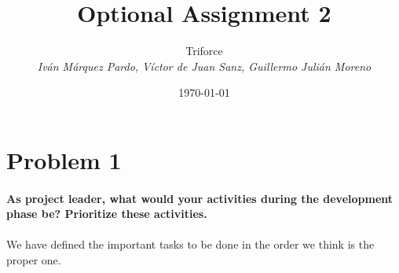 \documentclass{article}
\title{Optional Assignment 2}
\date{\today}
\author{{\Large Triforce} \\ \vspace{5pt} \textit{Iván Márquez Pardo, Víctor de Juan Sanz, Guillermo Julián Moreno}}
\begin{document}
\maketitle

\newpage

\section{Problem 1}
\paragraph{As project leader, what would your activities during the development phase be?
Prioritize these activities.}
\paragraph{}

We have defined the important tasks to be done in the order we think is the proper one.
\end{document}
